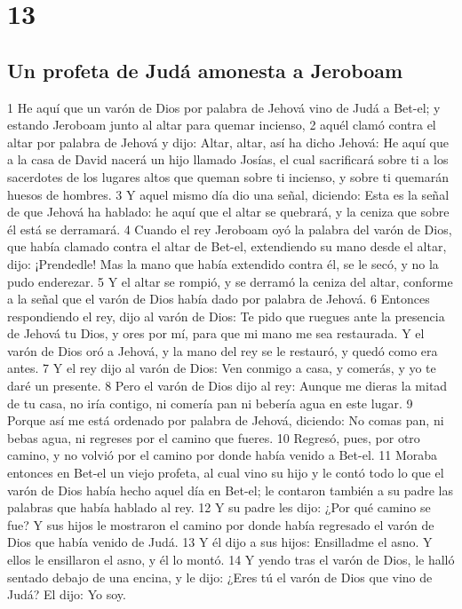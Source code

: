 \chapter{13}

\section*{Un profeta de Judá amonesta a Jeroboam}


1 He aquí que un varón de Dios por palabra de Jehová vino de Judá a Bet-el; y estando Jeroboam junto al altar para quemar incienso,
2 aquél clamó contra el altar por palabra de Jehová y dijo: Altar, altar, así ha dicho Jehová: He aquí que a la casa de David nacerá un hijo llamado Josías, el cual sacrificará sobre ti a los sacerdotes de los lugares altos que queman sobre ti incienso, y sobre ti quemarán huesos de hombres. 
3 Y aquel mismo día dio una señal, diciendo: Esta es la señal de que Jehová ha hablado: he aquí que el altar se quebrará, y la ceniza que sobre él está se derramará.
4 Cuando el rey Jeroboam oyó la palabra del varón de Dios, que había clamado contra el altar de Bet-el, extendiendo su mano desde el altar, dijo: ¡Prendedle! Mas la mano que había extendido contra él, se le secó, y no la pudo enderezar.
5 Y el altar se rompió, y se derramó la ceniza del altar, conforme a la señal que el varón de Dios había dado por palabra de Jehová.
6 Entonces respondiendo el rey, dijo al varón de Dios: Te pido que ruegues ante la presencia de Jehová tu Dios, y ores por mí, para que mi mano me sea restaurada. Y el varón de Dios oró a Jehová, y la mano del rey se le restauró, y quedó como era antes.
7 Y el rey dijo al varón de Dios: Ven conmigo a casa, y comerás, y yo te daré un presente.
8 Pero el varón de Dios dijo al rey: Aunque me dieras la mitad de tu casa, no iría contigo, ni comería pan ni bebería agua en este lugar.
9 Porque así me está ordenado por palabra de Jehová, diciendo: No comas pan, ni bebas agua, ni regreses por el camino que fueres.
10 Regresó, pues, por otro camino, y no volvió por el camino por donde había venido a Bet-el.
11 Moraba entonces en Bet-el un viejo profeta, al cual vino su hijo y le contó todo lo que el varón de Dios había hecho aquel día en Bet-el; le contaron también a su padre las palabras que había hablado al rey.
12 Y su padre les dijo: ¿Por qué camino se fue? Y sus hijos le mostraron el camino por donde había regresado el varón de Dios que había venido de Judá.
13 Y él dijo a sus hijos: Ensilladme el asno. Y ellos le ensillaron el asno, y él lo montó.
14 Y yendo tras el varón de Dios, le halló sentado debajo de una encina, y le dijo: ¿Eres tú el varón de Dios que vino de Judá? El dijo: Yo soy.
